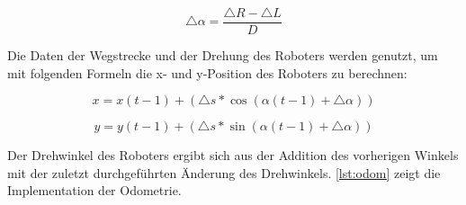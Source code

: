 \begin{equation}
\triangle \alpha = \dfrac{\triangle R - \triangle L}{D}
\end{equation} 

Die Daten der Wegstrecke und der Drehung des Roboters werden genutzt, um mit folgenden Formeln die x- und y-Position des Roboters zu berechnen:

\begin{equation}
x = x(t-1) + (\triangle s * \cos (\alpha (t-1) + \triangle \alpha))
\end{equation} 

\begin{equation}
y = y(t-1) + (\triangle s * \sin (\alpha (t-1) + \triangle \alpha))
\end{equation} 

Der Drehwinkel des Roboters ergibt sich aus der Addition des vorherigen Winkels mit der zuletzt durchgeführten Änderung des Drehwinkels. \autoref{lst:odom} zeigt die Implementation der Odometrie.



